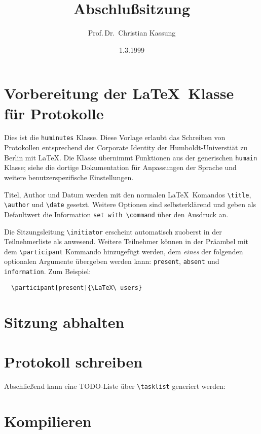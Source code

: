 \documentclass[header,internal]{huminutes}
\title{%
  Abschlußsitzung}
\author{%
  Prof.\,Dr.\ Christian Kassung}
\date{%
  1.3.1999}
\begin{document}
\frontmatter


\section{Vorbereitung der \LaTeX\ Klasse für Protokolle}

Dies ist die \texttt{huminutes} Klasse. Diese Vorlage erlaubt das Schreiben von Protokollen entsprechend der Corporate Identity der Humboldt-Universtiät zu Berlin mit \LaTeX. Die Klasse übernimmt Funktionen aus der generischen \texttt{humain} Klasse; siehe die dortige Dokumentation für Anpassungen der Sprache und weitere benutzerspezifische Einstellungen.

Titel, Author und Datum werden mit den normalen \LaTeX\ Komandos \verb|\title|, \verb|\author| und \verb|\date| gesetzt. Weitere Optionen sind selbsterklärend und geben als Defaultwert die Information \texttt{set with \textbackslash command} über den Ausdruck an.

Die Sitzungsleitung \verb|\initiator| erscheint automatisch zuoberst in der Teilnehmerliste als anwesend. Weitere Teilnehmer können in der Präambel mit dem \verb|\participant| Kommando hinzugefügt werden, dem \emph{eines} der folgenden optionalen Argumente übergeben werden kann: \verb|present|, \verb|absent| und \verb|information|. Zum Beispiel:

\begin{verbatim}
  \participant[present]{\LaTeX\ users}
\end{verbatim}


\section{Sitzung abhalten}


\section{Protokoll schreiben}

Abschließend kann eine TODO-Liste über \verb|\tasklist| generiert werden:

\tasklist

\section{Kompilieren}
\end{document}
